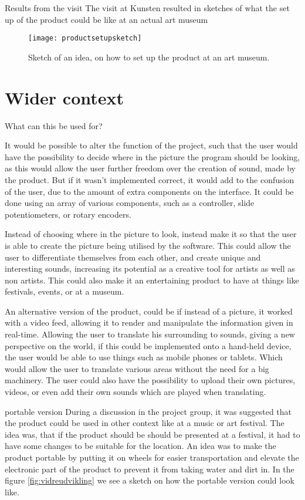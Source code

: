 Results from the visit
The visit at Kunsten resulted in sketches of what the set up of the product could be like at an actual art museum  
 
 \begin{figure}[!h] 
\centering
\texttt{[image: productsetupsketch]}
\caption{\label{Fig:productsetupsketch} Sketch of an idea, on how to set up the product at an art museum.}
\end{figure}
 
 
\section{Wider context}
What can this be used for?

It would be possible to alter the function of the project, such that the user would have the possibility to decide where in the picture the program should be looking, as this would allow the user further freedom over the creation of sound, made by the product. But if it wasn't implemented correct, it would add to the confusion of the user, due to the amount of extra components on the interface. It could be done using an array of various components, such as a controller, slide potentiometers, or rotary encoders. 

Instead of choosing where in the picture to look, instead make it so that the user is able to create the picture being utilised by the software. This could allow the user to differentiate themselves from each other, and create unique and interesting sounds, increasing its potential as a creative tool for artists as well as non artists. This could also make it an entertaining product to have at things like festivals, events, or at a museum. 

An alternative version of the product, could be if instead of a picture, it worked with a video feed, allowing it to render and manipulate the information given in real-time. Allowing the user to translate his surrounding to sounds, giving a new perspective on the world, if this could be implemented onto a hand-held device, the user would be able to use things such as mobile phones or tablets. Which would allow the user to translate various areas without the need for a big machinery. 
The user could also have the possibility to upload their own pictures, videos, or even add their own sounds which are played when translating. 

portable version
During a discussion in the project group, it was suggested that the product could be used in other context like at a music or art festival. The idea was, that if the product should be should be presented at a festival, it had to have some changes to be suitable for the location. An idea was to make the product portable by putting it on wheels for easier transportation and elevate the electronic part of the product to prevent it from taking water and dirt in. In the figure \ref{fig:vidreudvikling} we see a sketch on how the portable version could look like. 

